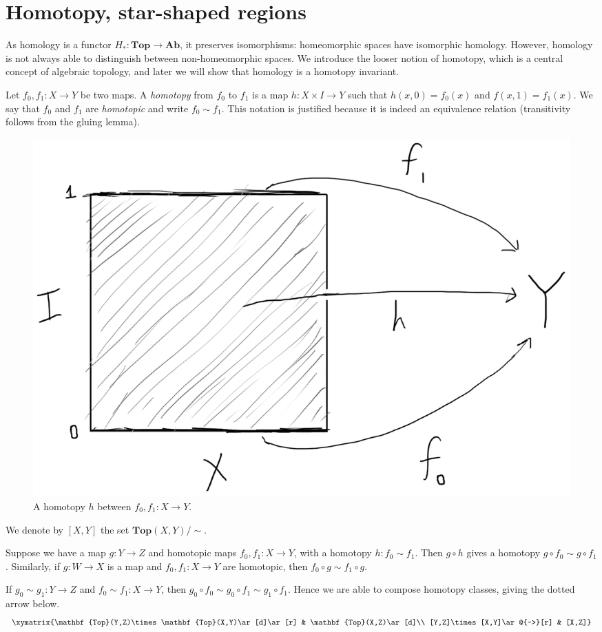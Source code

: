 \section{Homotopy, star-shaped regions}
As homology is a functor $H_\ast:\mathbf{Top}\to\mathbf{Ab}$, it preserves isomorphisms: homeomorphic spaces have isomorphic homology. However, homology is not always able to distinguish between non-homeomorphic spaces. We introduce the looser notion of homotopy, which is a central concept of algebraic topology, and later we will show that homology is a homotopy invariant.
\begin{definition}
Let $f_0,f_1:X\to Y$ be two maps. A \emph{homotopy} from $f_0$ to $f_1$ is a map $h:X\times I\to Y$ such that $h(x,0)=f_0(x)$ and $f(x,1)=f_1(x)$. We say that $f_0$ and $f_1$ are \emph{homotopic} and write $f_0\sim f_1$.  This notation is justified because it is indeed an equivalence relation (transitivity follows from the gluing lemma).
\end{definition}
\begin{figure}
	\centering
	\includegraphics[width=0.5\linewidth]{assets/L05/05-homotopy}
	\caption{A homotopy $h$ between $f_0,f_1:X\to Y$.}
	\label{fig:05-homotopy}
\end{figure}

We denote by $[X,Y]$ the set $\mathbf{Top}(X,Y)/\sim$.

Suppose we have a map $g: Y\to Z$ and homotopic maps $f_0,f_1:X\to Y$, with a homotopy $h:f_0\sim f_1$. Then $g\circ h$ gives a homotopy $g\circ f_0 \sim g\circ f_1$. Similarly, if $g:W\to X$ is a map and $f_0,f_1:X\to Y$ are homotopic, then $f_0\circ g\sim f_1\circ g$.

If $g_0\sim g_1:Y\to Z$ and $f_0\sim f_1: X\to Y$, then $g_0\circ f_0\sim g_0 \circ f_1\sim g_1 \circ f_1$. Hence we are able to compose homotopy classes, giving the dotted arrow below.
\begin{equation*}
\xymatrix{\mathbf{Top}(Y,Z)\times\mathbf{Top}(X,Y)\ar[d]\ar[r] & \mathbf{Top}(X,Z)\ar[d]\\
[Y,Z]\times[X,Y]\ar@{-->}[r] & [X,Z]}
\end{equation*}

